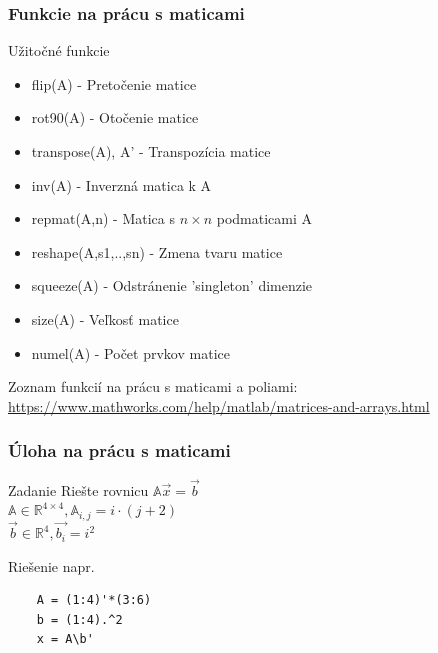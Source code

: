 \documentclass{beamer}
\begin{document}
\begin{frame}[fragile]
\frametitle{Funkcie na prácu s maticami}

  
  \begin{block}{Užitočné funkcie}
  \begin{itemize}
    \item flip(A) - Pretočenie matice
    \item rot90(A) - Otočenie matice
    \item transpose(A), A' - Transpozícia matice
    \item inv(A) - Inverzná matica k A
    \item repmat(A,n) - Matica s $n \times n$ podmaticami A 
    \item reshape(A,s1,..,sn) - Zmena tvaru matice
    \item squeeze(A) - Odstránenie 'singleton' dimenzie 
    \item size(A) - Veľkosť matice
    \item numel(A) - Počet prvkov matice    
  \end{itemize}
  \end{block}
  
  Zoznam funkcií na prácu s maticami a poliami: \\
  \url{https://www.mathworks.com/help/matlab/matrices-and-arrays.html}  
\end{frame}

\begin{frame}[fragile]
\frametitle{Úloha na prácu s maticami}
  
  \begin{block}{Zadanie}
  \centering
    Riešte rovnicu $\mathbb{A}\vec{x} = \vec{b}$ \\
    $\mathbb{A} \in \mathbb{R}^{4\times4}, \mathbb{A}_{i,j} = i\cdot (j + 2)$ \\
    $\vec{b} \in \mathbb{R}^4, \vec{b_i} = i^2$
  \end{block}
  
  \pause
  
  \begin{block}{Riešenie napr.}
  \begin{verbatim}
    A = (1:4)'*(3:6)
    b = (1:4).^2
    x = A\b'  \end{verbatim}
  \end{block}  
\end{frame}
\end{document}
